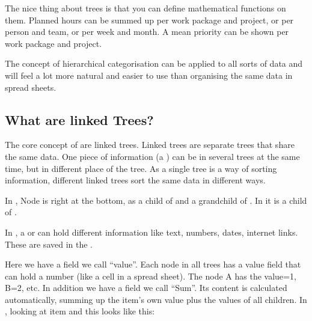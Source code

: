 \documentclass[letterpaper,10pt,english]{sphinxmanual}
\begin{document}
\sphinxAtStartPar
The nice thing about trees is that you can define mathematical functions on them.
Planned hours can be summed up per work package and project, or per person and team, or per week and month.
A mean priority can be shown per work package and project.

\sphinxAtStartPar
The concept of hierarchical categorisation can be applied to all sorts of data and will feel a lot more natural and easier to use than organising the same data in spread sheets.


\subsection{What are linked Trees?}
\label{\detokenize{introduction:what-are-linked-trees}}
\sphinxAtStartPar
The core concept of  are linked trees.
Linked trees are separate trees that share the same data.
One piece of information (a ) can be in several trees at the same time, but in different place of the tree.
As a single tree is a way of sorting information, different linked trees sort the same data in different ways.


\sphinxAtStartPar
In , Node  is right at the bottom, as a child of  and a grandchild of . In  it is a child of .

\sphinxAtStartPar
In , a  or  can hold different information like text, numbers, dates, internet links.
These are saved in the  .

\sphinxAtStartPar
Here we have a field we call “value”. Each node in all trees has a value field that can hold a number (like a cell in a spread sheet).
The node A has the value=1, B=2, etc.
In addition we have a field we call “Sum”.
Its content is calculated automatically, summing up the item’s own value plus the values of all children.
In , looking at item  and  this looks like this:

\end{document}
